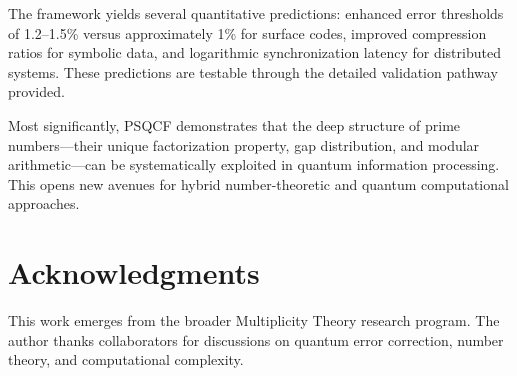 \documentclass[12pt,a4paper]{article}
\begin{document}
The framework yields several quantitative predictions: enhanced error thresholds of 1.2--1.5\% versus approximately 1\% for surface codes, improved compression ratios for symbolic data, and logarithmic synchronization latency for distributed systems. These predictions are testable through the detailed validation pathway provided.

Most significantly, PSQCF demonstrates that the deep structure of prime numbers---their unique factorization property, gap distribution, and modular arithmetic---can be systematically exploited in quantum information processing. This opens new avenues for hybrid number-theoretic and quantum computational approaches.

\section*{Acknowledgments}

This work emerges from the broader Multiplicity Theory research program. The author thanks collaborators for discussions on quantum error correction, number theory, and computational complexity.
\end{document}
